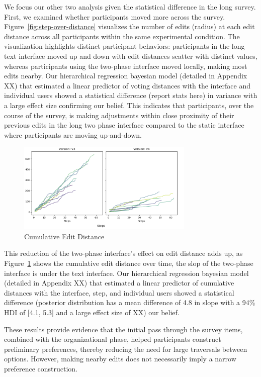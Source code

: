 We focus our other two analysis given the statistical difference in the long survey. First, we examined whether participants moved more across the survey. Figure~\ref{fig:step-over-distance} visualizes the number of edits (radius) at each edit distance across all participants within the same experimental condition. The visualization highlights distinct participant behaviors: participants in the long text interface moved up and down with edit distances scatter with distinct values, whereas participants using the two-phase interface moved locally, making most edits nearby. Our hierarchical regression bayesian model (detailed in Appendix XX) that estimated a linear predictor of voting distances with the interface and individual users showed a statistical difference (report stats here) in variance with a large effect size confirming our belief. This indicates that participants, over the course of the survey, is making adjustments within close proximity of their previous edits in the long two phase interface compared to the static interface where participants are moving up-and-down. 

\begin{figure}[ht]
    \centering
    \includegraphics[width=0.75\textwidth]{content/image/distance/sum_dist.png}
    \caption{Cumulative Edit Distance}
    \label{fig:sum-distance}
\end{figure}

This reduction of the two-phase interface's effect on edit distance adds up, as Figure~\ref{fig:sum-distance} shows the cumulative edit distance over time, the slop of the two-phase interface is under the text interface. Our hierarchical regression bayesian model (detailed in Appendix XX) that estimated a linear predictor of cumulative distances with the interface, step, and individual users showed a statistical difference (posterior distribution has a mean difference of 4.8 in slope with a 94\% HDI of [4.1, 5.3] and a large effect size of XX) our belief.

These results provide evidence that the initial pass through the survey items, combined with the organizational phase, helped participants construct preliminary preferences, thereby reducing the need for large traversals between options. However, making nearby edits does not necessarily imply a narrow preference construction. 


